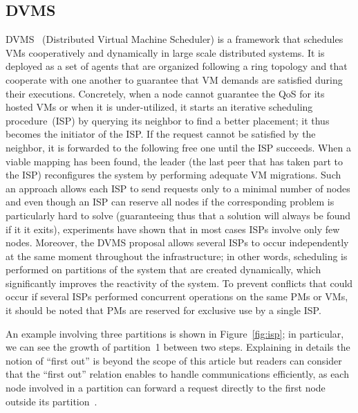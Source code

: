 \subsection{DVMS}\label{ssec:dvms}

DVMS~\cite{quesnel:ispa2013,quesnel:cpe2012} (Distributed Virtual Machine Scheduler) is a
framework that schedules VMs cooperatively and dynamically in large scale distributed
systems. It is deployed as a set of agents that are organized following a ring topology
and that cooperate with one another to guarantee that VM demands are satisfied during
their executions. Concretely, when a node cannot guarantee the QoS for its hosted VMs or
when it is under-utilized, it starts an iterative scheduling procedure~(ISP) by querying
its neighbor to find a better placement; it thus becomes the initiator of the ISP. If the
request cannot be satisfied by the neighbor, it is forwarded to the following free one
until the ISP succeeds. When a viable mapping has been found, the leader (\ie the last
peer that has taken part to the ISP) reconfigures the system by performing adequate VM
migrations. Such an approach allows each ISP to send requests only to a minimal number of
nodes and even though an ISP can reserve all nodes if the corresponding problem is
particularly hard to solve (guaranteeing thus that a solution will always be found if it
it exits), experiments have shown that in most cases ISPs involve only few
nodes. Moreover, the DVMS proposal allows several ISPs to occur independently at the same
moment throughout the infrastructure; in other words, scheduling is performed on
partitions of the system that are created dynamically, which significantly improves the
reactivity of the system. To prevent conflicts that could occur if several ISPs performed
concurrent operations on the same PMs or VMs, it should be noted that PMs are reserved for
exclusive use by a single ISP.

An example involving three partitions is shown in Figure~\ref{fig:isp}; in particular, we
can see the growth of partition~1 between two steps. Explaining in details the notion of
``first out'' is beyond the scope of this article but readers can consider that the
``first out'' relation enables to handle communications efficiently, as each node involved
in a partition can forward a request directly to the first node outside its
partition~\cite{quesnel:cpe2012}.

